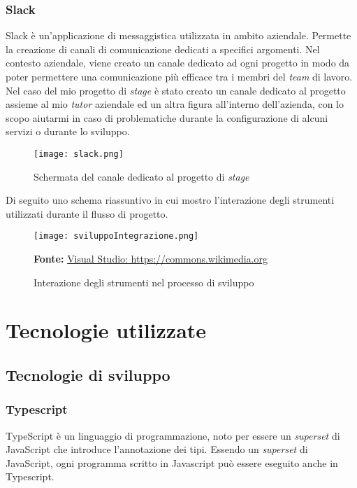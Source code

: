 \subsubsection{Slack}
Slack è un'applicazione di messaggistica utilizzata in ambito aziendale.
Permette la creazione di canali di comunicazione dedicati a specifici argomenti. Nel contesto aziendale, viene creato un canale dedicato ad ogni progetto in modo da poter permettere una comunicazione più efficace tra i membri del \textit{team} di lavoro.
Nel caso del mio progetto di \textit{stage} è stato creato un canale dedicato al progetto assieme al mio \textit{tutor} aziendale ed un altra figura all'interno dell'azienda, con lo scopo aiutarmi in caso di problematiche durante la configurazione di alcuni servizi o durante lo sviluppo.
\begin{figure}[H]
    \centering
    \texttt{[image: slack.png]}
    \caption{Schermata del canale dedicato al progetto di \textit{stage}}
    \label{fig:Slack}
\end{figure}
\noindent
Di seguito uno schema riassuntivo in cui mostro l'interazione degli strumenti utilizzati durante il flusso di progetto.
\begin{figure}[H]
    \centering
    \texttt{[image: sviluppoIntegrazione.png]}
    \caption{Interazione degli strumenti nel processo di sviluppo}
    \small \textbf{Fonte:} \href{https://commons.wikimedia.org/wiki/File:Visual_Studio_Code_1.35_icon.svg}{Visual Studio: https://commons.wikimedia.org}

    \label{fig:sviluppoIntegrazione}
\end{figure}

\section{Tecnologie utilizzate} \label{sec:tecnologie}
\subsection{Tecnologie di sviluppo}
\subsubsection{Typescript}
TypeScript è un linguaggio di programmazione, noto per essere un \textit{superset} di JavaScript che introduce l'annotazione dei tipi. Essendo un \textit{superset} di JavaScript, ogni programma scritto in Javascript può essere eseguito anche in Typescript.

